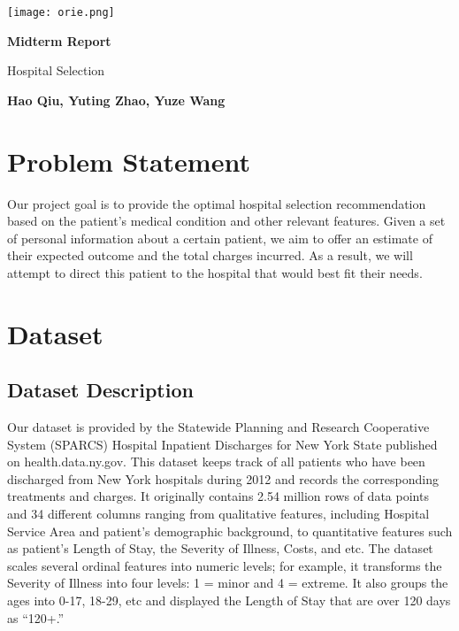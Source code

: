 \documentclass[12pt]{article}
\begin{document}
\begin{titlepage}
   \begin{center}
       
       \vspace*{1cm}
       \begin{center}
       \texttt{[image: orie.png]}
       \end{center}
       \vspace{8cm}
       
       \textbf{\Huge Midterm Report}
       
       \vspace{1cm}
        \larger Hospital Selection
 
       \vspace{3cm}
 
       \textbf{Hao Qiu, Yuting Zhao, Yuze Wang}
       
       \vspace{1cm}
       
 
       \vfill
       \vspace{0.8cm}
   \end{center}
\end{titlepage}

\section{Problem Statement}
Our project goal is to provide the optimal hospital selection recommendation based on the patient’s medical condition and other relevant features. Given a set of personal information about a certain patient, we aim to offer an estimate of their expected outcome and the total charges incurred. As a result, we will attempt to direct this patient to the hospital that would best fit their needs.

\section{Dataset}

\subsection{Dataset Description} 
Our dataset is provided by the Statewide Planning and Research Cooperative System (SPARCS) Hospital Inpatient Discharges for New York State published on health.data.ny.gov. This dataset keeps track of all patients who have been discharged from New York hospitals during 2012 and records the corresponding treatments and charges. \bigskip
\newline It originally contains 2.54 million rows of data points and 34 different columns ranging from qualitative features, including Hospital Service Area and patient’s demographic background, to quantitative features such as patient’s Length of Stay, the Severity of Illness, Costs, and etc. The dataset scales several ordinal features into numeric levels; for example, it transforms the Severity of Illness into four levels: 1 = minor and 4 = extreme. It also groups the ages into 0-17, 18-29, etc and displayed the Length of Stay that are over 120 days as “120+.”
\end{document}
